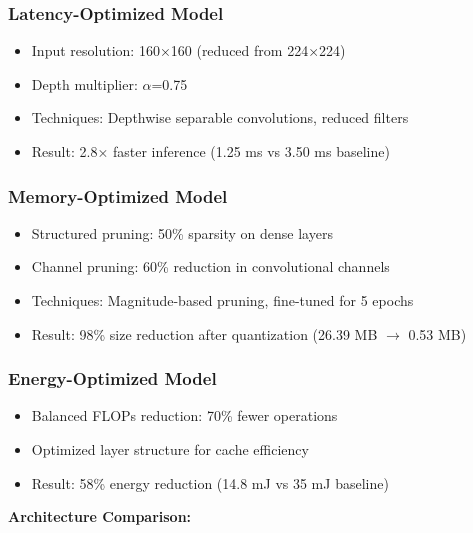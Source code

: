 \documentclass[10pt, a4paper]{article}
\begin{document}
\subsubsection{Latency-Optimized Model}
\begin{itemize}
    \item Input resolution: 160×160 (reduced from 224×224)
    \item Depth multiplier: $\alpha$=0.75
    \item Techniques: Depthwise separable convolutions, reduced filters
    \item Result: 2.8× faster inference (1.25 ms vs 3.50 ms baseline)
\end{itemize}

\subsubsection{Memory-Optimized Model}
\begin{itemize}
    \item Structured pruning: 50\% sparsity on dense layers
    \item Channel pruning: 60\% reduction in convolutional channels
    \item Techniques: Magnitude-based pruning, fine-tuned for 5 epochs
    \item Result: 98\% size reduction after quantization (26.39 MB $\rightarrow$ 0.53 MB)
\end{itemize}

\subsubsection{Energy-Optimized Model}
\begin{itemize}
    \item Balanced FLOPs reduction: 70\% fewer operations
    \item Optimized layer structure for cache efficiency
    \item Result: 58\% energy reduction (14.8 mJ vs 35 mJ baseline)
\end{itemize}

\textbf{Architecture Comparison:}
\end{document}
